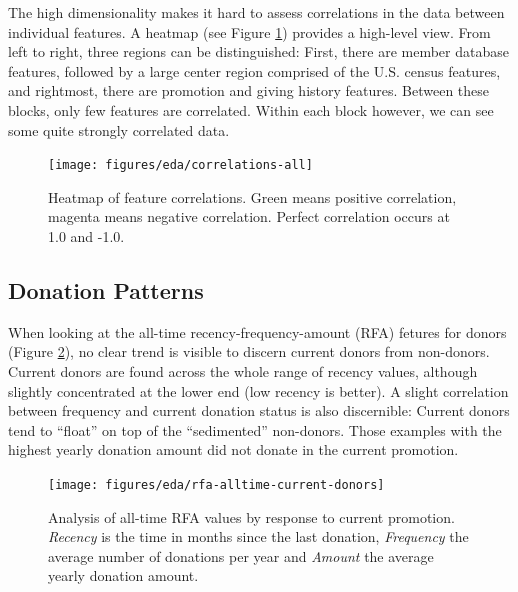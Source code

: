 \documentclass[
  11pt,
  a4paper,
  DIV=12,captions=tableheading,oneside,titlepage]{scrbook}
\begin{document}
The high dimensionality makes it hard to assess correlations in the data between individual features. A heatmap (see Figure \ref{fig:heatmap-all}) provides a high-level view. From left to right, three regions can be distinguished: First, there are member database features, followed by a large center region comprised of the U.S. census features, and rightmost, there are promotion and giving history features. Between these blocks, only few features are correlated. Within each block however, we can see some quite strongly correlated data.



\begin{figure}

{\centering \texttt{[image: figures/eda/correlations-all]} 

}

\caption{Heatmap of feature correlations. Green means positive correlation, magenta means negative correlation. Perfect correlation occurs at 1.0 and -1.0.}\label{fig:heatmap-all}
\end{figure}

\hypertarget{donation-patterns}{%
\subsection{Donation Patterns}\label{donation-patterns}}

When looking at the all-time recency-frequency-amount (RFA) fetures for donors (Figure \ref{fig:rfa-alltime}), no clear trend is visible to discern current donors from non-donors. Current donors are found across the whole range of recency values, although slightly concentrated at the lower end (low recency is better). A slight correlation between frequency and current donation status is also discernible: Current donors tend to ``float'' on top of the ``sedimented'' non-donors. Those examples with the highest yearly donation amount did not donate in the current promotion.



\begin{figure}

{\centering \texttt{[image: figures/eda/rfa-alltime-current-donors]} 

}

\caption{Analysis of all-time RFA values by response to current promotion. \emph{Recency} is the time in months since the last donation, \emph{Frequency} the average number of donations per year and \emph{Amount} the average yearly donation amount.}\label{fig:rfa-alltime}
\end{figure}
\end{document}
